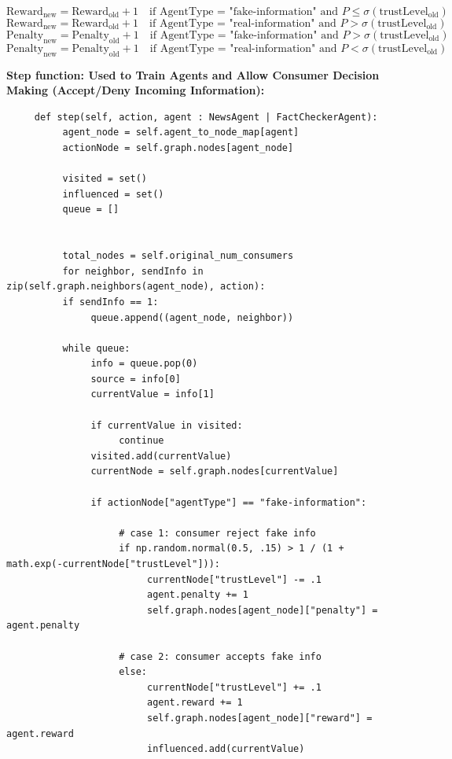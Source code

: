 \documentclass[twoside]{article}
\begin{document}
\[
\text{Reward}_{\text{new}} = \text{Reward}_{\text{old}} + 1 \quad \text{if AgentType = "fake-information" and } P \leq \sigma(\text{trustLevel}_{\text{old}})
\]
\[
\text{Reward}_{\text{new}} = \text{Reward}_{\text{old}} + 1 \quad \text{if AgentType = "real-information" and } P > \sigma(\text{trustLevel}_{\text{old}})
\]
\[
\text{Penalty}_{\text{new}} = \text{Penalty}_{\text{old}} + 1 \quad \text{if  AgentType = "fake-information" and } P > \sigma(\text{trustLevel}_{\text{old}})
\]
\[
\text{Penalty}_{\text{new}} = \text{Penalty}_{\text{old}} + 1 \quad \text{if  AgentType = "real-information" and } P < \sigma(\text{trustLevel}_{\text{old}})
\]

\textbf{Step function: Used to Train Agents and Allow Consumer Decision Making (Accept/Deny Incoming Information):}
\begin{verbatim}
     def step(self, action, agent : NewsAgent | FactCheckerAgent):
          agent_node = self.agent_to_node_map[agent]
          actionNode = self.graph.nodes[agent_node]

          visited = set()
          influenced = set()
          queue = []
          

          total_nodes = self.original_num_consumers
          for neighbor, sendInfo in zip(self.graph.neighbors(agent_node), action):
          if sendInfo == 1:
               queue.append((agent_node, neighbor))

          while queue:
               info = queue.pop(0)
               source = info[0]
               currentValue = info[1]

               if currentValue in visited:
                    continue
               visited.add(currentValue)
               currentNode = self.graph.nodes[currentValue]
               
               if actionNode["agentType"] == "fake-information":

                    # case 1: consumer reject fake info
                    if np.random.normal(0.5, .15) > 1 / (1 + math.exp(-currentNode["trustLevel"])):
                         currentNode["trustLevel"] -= .1
                         agent.penalty += 1
                         self.graph.nodes[agent_node]["penalty"] = agent.penalty

                    # case 2: consumer accepts fake info
                    else:
                         currentNode["trustLevel"] += .1 
                         agent.reward += 1
                         self.graph.nodes[agent_node]["reward"] = agent.reward
                         influenced.add(currentValue)


\end{verbatim}
\end{document}
